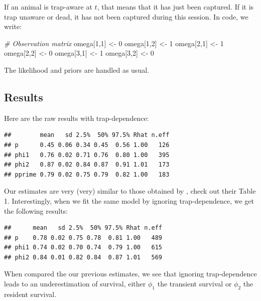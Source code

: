 \documentclass[
  12pt,
]{krantz}
\newenvironment{Shaded}{\begin{snugshade}}{\end{snugshade}}
\newcommand{\CommentTok}[1]{\textcolor[rgb]{0.56,0.35,0.01}{\textit{#1}}}
\newcommand{\DecValTok}[1]{\textcolor[rgb]{0.00,0.00,0.81}{#1}}
\newcommand{\NormalTok}[1]{#1}
\newcommand{\OtherTok}[1]{\textcolor[rgb]{0.56,0.35,0.01}{#1}}
\begin{document}
If an animal is trap-aware at \(t\), that means that it has just been captured. If it is trap unaware or dead, it has not been captured during this session. In code, we write:

\begin{Shaded}
\begin{Highlighting}[]
\CommentTok{\# Observation matrix}
\NormalTok{  omega[}\DecValTok{1}\NormalTok{,}\DecValTok{1}\NormalTok{] }\OtherTok{\textless{}{-}} \DecValTok{0}
\NormalTok{  omega[}\DecValTok{1}\NormalTok{,}\DecValTok{2}\NormalTok{] }\OtherTok{\textless{}{-}} \DecValTok{1}
\NormalTok{  omega[}\DecValTok{2}\NormalTok{,}\DecValTok{1}\NormalTok{] }\OtherTok{\textless{}{-}} \DecValTok{1}
\NormalTok{  omega[}\DecValTok{2}\NormalTok{,}\DecValTok{2}\NormalTok{] }\OtherTok{\textless{}{-}} \DecValTok{0}
\NormalTok{  omega[}\DecValTok{3}\NormalTok{,}\DecValTok{1}\NormalTok{] }\OtherTok{\textless{}{-}} \DecValTok{1}
\NormalTok{  omega[}\DecValTok{3}\NormalTok{,}\DecValTok{2}\NormalTok{] }\OtherTok{\textless{}{-}} \DecValTok{0}
\end{Highlighting}
\end{Shaded}

The likelihood and priors are handled as usual.

\subsection{Results}\label{results-3}

Here are the raw results with trap-dependence:

\begin{verbatim}
##        mean   sd 2.5%  50% 97.5% Rhat n.eff
## p      0.45 0.06 0.34 0.45  0.56 1.00   126
## phi1   0.76 0.02 0.71 0.76  0.80 1.00   395
## phi2   0.87 0.02 0.84 0.87  0.91 1.01   173
## pprime 0.79 0.02 0.75 0.79  0.82 1.00   183
\end{verbatim}

Our estimates are very (very) similar to those obtained by \citet{pradeltrapdep2012}, check out their Table 1. Interestingly, when we fit the same model by ignoring trap-dependence, we get the following results:

\begin{verbatim}
##      mean   sd 2.5%  50% 97.5% Rhat n.eff
## p    0.78 0.02 0.75 0.78  0.81 1.00   489
## phi1 0.74 0.02 0.70 0.74  0.79 1.00   615
## phi2 0.84 0.01 0.82 0.84  0.87 1.01   569
\end{verbatim}

When compared the our previous estimates, we see that ignoring trap-dependence leads to an underestimation of survival, either \(\phi_1\) the transient survival or \(\phi_{2}\) the resident survival.
\end{document}

